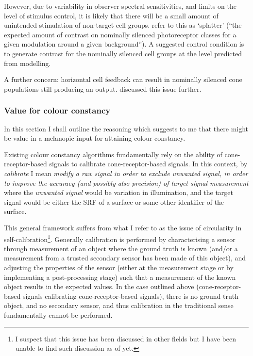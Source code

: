 However, due to variability in observer spectral sensitivities, and limits on the level of stimulus control, it is likely that there will be a small amount of unintended stimulation of non-target cell groups. \citet{spitschan_selective_2015} refer to this as `splatter' (``the expected amount of contrast on nominally silenced photoreceptor classes for a given modulation around a given background''). A suggested control condition is to generate contrast for the nominally silenced cell groups at the level predicted from modelling.

A further concern: horizontal cell feedback can result in nominally silenced cone populations still producing an output. \citet{kamar_silent-substitution_2019} discussed this issue further.

\subsubsection{Value for colour constancy}

In this section I shall outline the reasoning which suggests to me that there might be value in a melanopic input for attaining colour constancy.

Existing colour constancy algorithms fundamentally rely on the ability of cone-receptor-based signals to calibrate cone-receptor-based signals. In this context, by \emph{calibrate} I mean  \emph{modify a raw signal in order to exclude unwanted signal, in order to improve the accuracy (and possibly also precision) of target signal measurement} where the \emph{unwanted signal} would be variation in illumination, and the target signal would be either the \gls{SRF} of a surface or some other identifier of the surface.

This general framework suffers from what I refer to as the issue of circularity in self-calibration\footnote{I suspect that this issue has been discussed in other fields but I have been unable to find such discussion as of yet.}. Generally calibration is performed by characterising a sensor through measurement of an object where the ground truth is known (and/or a measurement from a trusted secondary sensor has been made of this object), and adjusting the properties of the sensor (either at the measurement stage or by implementing a post-processing stage) such that a measurement of the known object results in the expected values. In the case outlined above (cone-receptor-based signals calibrating cone-receptor-based signals), there is no ground truth object, and no secondary sensor, and thus calibration in the traditional sense fundamentally cannot be performed.

